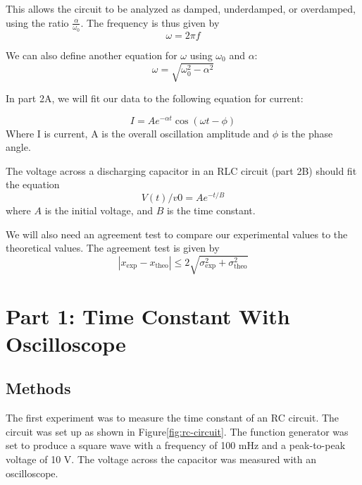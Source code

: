 \documentclass[11pt]{article}
\let\oldsection\section
\renewcommand\section{\clearpage\oldsection}
\begin{document}
    This allows the circuit to be analyzed as damped, underdamped, or overdamped, using the ratio $\frac{\alpha}{\omega_0}$.
    The frequency is thus given by
    \begin{equation}
        \omega = 2\pi f
    \end{equation}\label{eq:frequency}

    We can also define another equation for ${\omega}$ using ${\omega_0}$ and ${\alpha}$:
    \begin{equation}
        \omega = \sqrt{\omega_0^2 - \alpha^2}
    \end{equation}\label{eq:omega}

    In part 2A, we will fit our data to the following equation for current:

    \begin{equation}
        I = Ae^{-\alpha t} \cos(\omega t - \phi)
    \end{equation}\label{eq:current_2a}
    Where I is current, A is the overall oscillation amplitude and $\phi$ is the phase angle.

    The voltage across a discharging capacitor in an RLC circuit (part 2B) should fit the equation
    \begin{equation}
        V(t)/v0 = A e^{-t/B}
    \end{equation}\label{eq:capacitor-voltage}
    where $A$ is the initial voltage, and $B$ is the time constant.

    We will also need an agreement test to compare our experimental values to the theoretical values.
    The agreement test is given by
    \begin{equation}
        |x_{\text{exp}} - x_{\text{theo}}| \le 2 \sqrt{\sigma_{\text{exp}}^2 + \sigma_{\text{theo}}^2}
    \end{equation}\label{eq:agreement-test}

    \section{Part 1: Time Constant With Oscilloscope}\label{sec:measuring-time-constant}

    \subsection{Methods}\label{subsec:measuring-time-constant-methods}

    The first experiment was to measure the time constant of an RC circuit.
    The circuit was set up as shown in Figure\ref{fig:rc-circuit}.
    The function generator was set to produce a square wave with a frequency of 100 mHz and a peak-to-peak voltage of 10 V.
    The voltage across the capacitor was measured with an oscilloscope.
\end{document}
